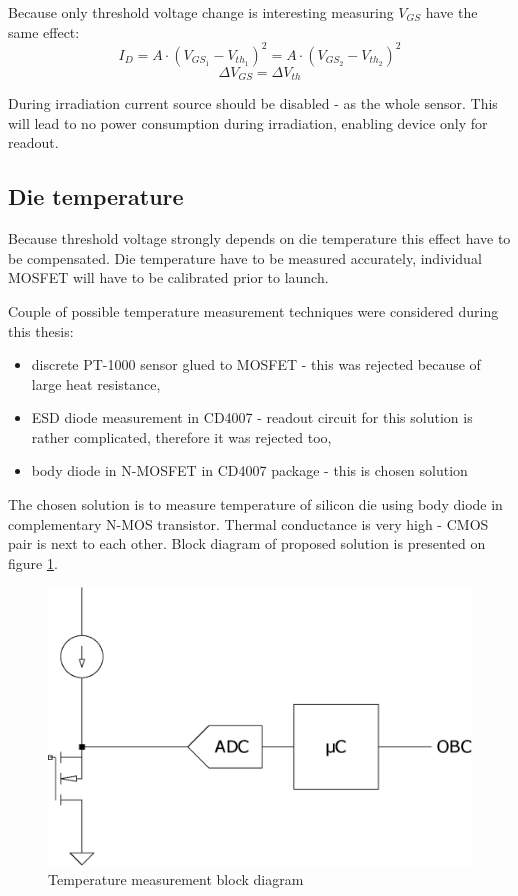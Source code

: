         Because only threshold voltage change is interesting measuring $V_{GS}$ have the same effect:
        $$I_D = A \cdot (V_{GS_1} - V_{th_1})^2 = A \cdot (V_{GS_2} - V_{th_2})^2$$
        $$\Delta V_{GS} = \Delta V_{th}$$

        During irradiation current source should be disabled - as the whole sensor. This will lead to no power consumption during irradiation, enabling device only for readout.

    \subsection{Die temperature}
        Because threshold voltage strongly depends on die temperature this effect have to be compensated. Die temperature have to be measured accurately, individual MOSFET will have to be calibrated prior to launch.

        Couple of possible temperature measurement techniques were considered during this thesis:
        \begin{itemize}
            \item discrete PT-1000 sensor glued to MOSFET - this was rejected because of large heat resistance,
            \item ESD diode measurement in CD4007 - readout circuit for this solution is rather complicated, therefore it was rejected too,
            \item body diode in N-MOSFET in CD4007 package - this is chosen solution
        \end{itemize}

        The chosen solution is to measure temperature of silicon die using body diode in complementary N-MOS transistor. Thermal conductance is very high - CMOS pair is next to each other. Block diagram of proposed solution is presented on figure \ref{Temperature_measurement_block_diagram}.

        \begin{figure}[H]
            \centering
            \includegraphics[width=0.3\paperwidth]{img/n-mos-temperature.eps}
            \caption{Temperature measurement block diagram}
            \label{Temperature_measurement_block_diagram}
        \end{figure}

